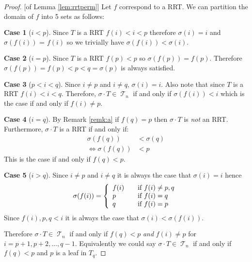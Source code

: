 \documentclass[10pt]{amsart} %
\theoremstyle{definition}
\newtheorem{case}{Case}
\DeclareMathOperator{\T}{\mathcal{T}}
\begin{document}
\begin{proof}{[of Lemma \ref{lem:rrtperm}]}  
Let $f$ correspond to a RRT.  We can partition the domain of $f$ into 5 sets as follows: 
\begin{case}[$i<p$]
Since $T$ is a RRT $f(i) < i < p$ therefore $\sigma(i) = i$ and $\sigma(f(i))$ = $f(i)$ so we trivially have $\sigma(f(i)) < \sigma(i)$.
\end{case}
\begin{case}[$i=p$]
Since $T$ is a RRT $f(p) < p$ so $\sigma(f(p)) = f(p)$.  Therefore $\sigma(f(p)) = f(p) < p < q  = \sigma(p)$ is always satisfied.
\end{case}
\begin{case}[$p<i<q$]
 Since $i \neq p$ and $i \neq q$,  $\sigma(i) = i$. Also note that since $T$ is a RRT $f(i) < i < q$.  Therefore, $\sigma \cdot T \in \T_n$ if and only if $\sigma(f(i)) < i$ which is the case if and only if $f(i) \neq p$.   
\end{case}
\begin{case}[$i=q$]
 By Remark \ref{remk:a} if $f(q) = p$ then $\sigma \cdot T$ is \emph{not} an RRT.  
 Furthermore, $\sigma \cdot T$ is a RRT if and only if:
 \begin{align*}
  \sigma(f(q)) &< \sigma(q)  \\
  \iff \sigma(f(q)) &< p
 \end{align*}
This is the case if and only if $f(q) <p$.
\end{case}
\begin{case}[$i>q$]
Since $i \neq p$ and $i \neq q$ it is always the case that $\sigma(i) = i$ hence 
\[\sigma(f(i)) =
\left\{
  \begin{array}{l l}
    f(i) & \quad \text{if $f(i) \neq p,q$}\\
    p & \quad \text{if $f(i) = q$}\\
    q & \quad \text{if $f(i) = p$}
  \end{array} \right.\]
Since $f(i),p,q < i$ it is always the case that $\sigma(i) < \sigma(f(i))$.  
\end{case}
Therefore $\sigma \cdot T \in \T_n$ if and only if $f(q) < p $ \emph{and} $f(i) \neq p$ for $i = p+1,p+2,\dots,q-1$.  Equivalently we could say $\sigma \cdot T \in \T_n$ if and only if $f(q)< p$ and $p$ is a leaf in $T_q$. 
\end{proof}

\end{document}
